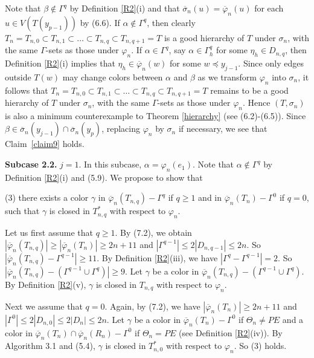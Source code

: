 \documentclass[11pt]{article}
\newcommand{\phibar}{\overline{\varphi}}
\begin{document}
Note that $\beta\notin\Gamma^{q}$ by Definition \ref{R2}(i) and that $\overline{\sigma}_n(u)=\phibar_n(u)$ for each $u\in V(T(y_{p-1}))$ by (6.6).  If $\alpha\notin \Gamma^{q}$, then clearly $T_n=T_{n,0} \subset T_{n,1} \subset \ldots \subset T_{n,q} 
\subset T_{n,q+1}=T$ is a good hierarchy of $T$ under $\sigma_n$, with the same $\Gamma$-sets as those under $\varphi_n$. 
If $\alpha\in \Gamma^{q}$, say $\alpha\in \Gamma^{q}_{h}$ for some $\eta_h\in D_{n,q}$, then Definition \ref{R2}(i)
implies that $\eta_h \in\overline{\varphi}_n(w)$ for some $w\preceq  y_{j-1}$. Since only edges outside $T(w)$ may 
change colors between $\alpha$ and $\beta$ as we transform $\varphi_n$ into $\sigma_n$, it follows that $T_n=T_{n,0} 
\subset T_{n,1} \subset \ldots \subset T_{n,q} \subset T_{n,q+1}=T$ remains to be a good hierarchy of $T$ under $\sigma_n$, 
with the same $\Gamma$-sets as those under $\varphi_n$. Hence $(T, \sigma_n)$ is also a minimum counterexample to Theorem 
\ref{hierarchy} (see (6.2)-(6.5)). Since $\beta\in \overline{\sigma}_n(y_{j-1}) \cap \overline{\sigma}_n(y_p)$, replacing 
$\varphi_n$ by $\sigma_n$ if necessary, we see that Claim~\ref{claim9} holds.

{\bf Subcase 2.2.} $j=1$. In this subcase, $\alpha=\varphi_n(e_1)$. Note that $\alpha\notin\Gamma^{q}$ by Definition \ref{R2}(i)
and (5.9). We propose to show that 

(3) there exists a color $\gamma$ in $\phibar_n(T_{n,q})-\Gamma^{q}$ if $q\ge 1$ and in $\phibar_n(T_{n})-\Gamma^{0}$ 
if $q=0$, such that $\gamma$ is closed in $T_{n,q}^*$ with respect to $\varphi_n$. 

Let us first assume that $q\geq 1$. By (7.2), we obtain $|\phibar_n(T_{n,q})|\ge |\phibar_n(T_{n})|\ge 2n+11$ and 
$|\Gamma^{q-1}|\le 2 |D_{n,q-1}|\le 2n$. So $|\phibar_n(T_{n,q})-\Gamma^{q-1}|\ge 11$. By Definition \ref{R2}(iii), we 
have $|\Gamma^{q}-\Gamma^{q-1}|= 2$. So $|\phibar_n(T_{n,q})-(\Gamma^{q-1} \cup \Gamma^{q}) |\ge 9$. Let $\gamma$ be a 
color in $\phibar_n(T_{n,q})-(\Gamma^{q-1} \cup \Gamma^{q})$. By Definition \ref{R2}(v), $\gamma$ is closed in $T_{n,q}$ 
with respect to $\varphi_n$.  

Next we assume that $q=0$. Again, by (7.2), we have $|\phibar_n(T_{n})|\ge 2n+11$ and $|\Gamma^{0}|\le 2 |D_{n,0}|\le 
2 |D_n| \le 2n$. Let $\gamma$ be a color in $\phibar_n(T_{n})-\Gamma^{0}$ if $\Theta_n\ne PE$ and a color in 
$\phibar_n(T_n) \cap \phibar_n(R_n)-\Gamma^0$ if $\Theta_n=PE$ (see Definition \ref{R2}(iv)). By Algorithm 3.1 
and (5.4),  $\gamma$ is closed in $T_{n,0}^*$ with respect to $\varphi_n$. So (3) holds.
\end{document}
